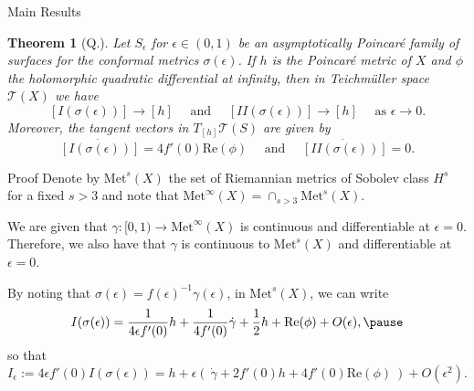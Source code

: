 \documentclass[professionalfont]{beamer}
\newtheorem*{thm*}{Theorem}
\newcommand{\two}{I\!I}
\begin{document}
%


\begin{frame}{Main Results}

\begin{thm*}[Q.]
Let $S_\epsilon$ for $\epsilon \in (0,1)$ be an asymptotically Poincar\'e family of surfaces for the conformal metrics $\sigma(\epsilon)$. 
If $h$ is the Poincar\'e metric of $X$ and $\phi$  the holomorphic quadratic differential at infinity, then in Teichm\"uller space $\mathcal{T}(X)$ we have 
\[
[I(\sigma(\epsilon))] \to [h]
\quad \text{ and } \quad
[\two(\sigma(\epsilon))] \to [h]
\quad \text{ as } \epsilon \to 0.
\]
Moreover, the tangent vectors in $T_{[h]} \mathcal{T}(S)$ are given by 
\[
\dot{[I(\sigma(\epsilon))]}  = 4 f'(0) \mathrm{Re}(\phi) \quad \text{ and } \quad \dot{[\two(\sigma(\epsilon))]} = 0.
\]
\end{thm*}

\end{frame}




\begin{frame}{Proof}
Denote by $\mathrm{Met}^s(X)$ the set of Riemannian metrics of Sobolev class $H^s$ for a fixed $s > 3$ and note that $\mathrm{Met}^\infty(X) = \cap_{s > 3} \mathrm{Met}^s(X)$. \pause
\newline

We are given that $\gamma:[0,1) \to \mathrm{Met}^\infty(X)$ is continuous and differentiable at $\epsilon = 0$. 
Therefore, we also have that $\gamma$ is continuous to $\mathrm{Met}^s(X)$ and differentiable at $\epsilon = 0$. \pause
\newline

By noting that $\sigma(\epsilon) = f(\epsilon)^{-1}\gamma(\epsilon)$, in $\mathrm{Met}^s(X)$, we can write 
\[
I(\sigma(\epsilon)) =  \frac{1}{4\epsilon f'(0)} h + \frac{1}{4 f'(0)} \dot{\gamma} + \frac{1}{2} h + \mathrm{Re}(\phi) + O(\epsilon), \pause
\]
so that 
\[
I_\epsilon := 4\epsilon f'(0)I(\sigma(\epsilon)) = h + \epsilon( \ \dot{\gamma} + 2 f'(0)h + 4 f'(0) \mathrm{Re}(\phi) \ ) + O(\epsilon^2).
\]

\end{frame}


\end{document}
